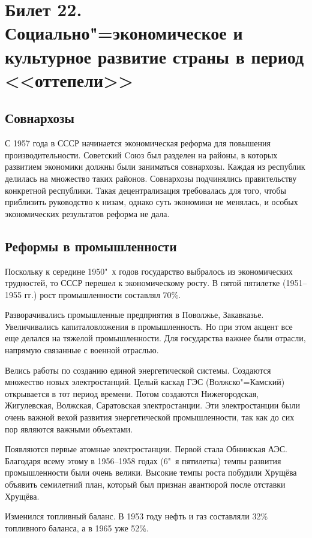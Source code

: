 \section{Билет 22. Социально"=экономическое и культурное развитие страны в период <<оттепели>>}

\subsection{Совнархозы}

С 1957 года в СССР начинается экономическая реформа для повышения производительности. Советский Cоюз был разделен на районы, в которых развитием экономики должны были заниматься совнархозы. Каждая из республик делилась на множество таких районов. Совнархозы подчинялись правительству конкретной республики. Такая децентрализация требовалась для того, чтобы приблизить руководство к низам, однако суть экономики не менялась, и особых экономических результатов реформа не дала.

\subsection{Реформы в промышленности}

Поскольку к середине 1950"~х годов государство выбралось из экономических трудностей, то СССР перешел к экономическому росту. В пятой пятилетке (1951--1955 гг.) рост промышленности составлял 70\%. 

Разворачивались промышленные предприятия в Поволжье, Закавказье. Увеличивались капиталовложения в промышленность. Но при этом акцент все еще делался на тяжелой промышленности. Для государства важнее были отрасли, напрямую связанные с военной отраслью. 

Велись работы по созданию единой энергетической системы. Создаются множество новых электростанций. Целый каскад ГЭС (Волжско"=Камский) открывается в тот период времени. Потом создаются Нижегородская, Жигулевская, Волжская, Саратовская электростанции. Эти электростанции были очень важной вехой развития энергетической промышленности, так как до сих пор являются важными объектами. 

Появляются первые атомные электростанции. Первой стала Обнинская АЭС. Благодаря всему этому в 1956--1958 годах (6"~я пятилетка) темпы развития промышленности были очень велики. Высокие темпы роста побудили Хрущёва объявить семилетний план, который был признан авантюрой после отставки Хрущёва.

Изменился топливный баланс. В 1953 году нефть и газ составляли 32\% топливного баланса, а в 1965 уже 52\%. 

